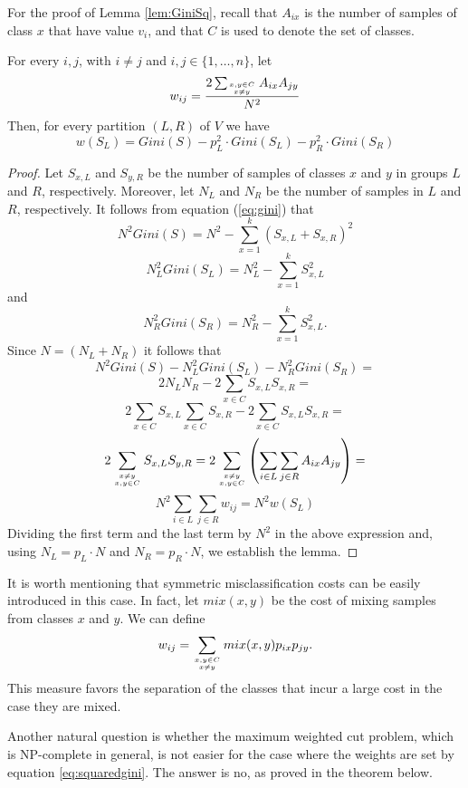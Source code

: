 For the proof of Lemma \ref{lem:GiniSq}, recall that $A_{ix}$ is the number
of samples of  class $x$ that have value $v_i$, and that $C$ is used to denote the set of classes.


\begin{lemma}
For every $i,j$, with $i \ne j$ and $i,j \in \{1,\ldots,n\}$,  let
\begin{equation}
 \label{eq:squaredgini}
w_{ij} = \frac{ 2 \sum_{ x,y \in C \atop x \ne y }  A_{ix} A_{jy} }{ N^2} 
\end{equation}
Then, for every partition $(L,R)$ of  $V$ we have
$$w(S_L)=Gini(S) - p^2_L \cdot Gini(S_L) - p^2_R \cdot Gini(S_R)$$
\label{lem:GiniSq}
\end{lemma}

\begin{proof}
Let $S_{x,L}$ and $S_{y,R}$  be the number of samples of classes $x$ and $y$ in groups $L$
and $R$, respectively. Moreover, let  $N_L$ and $N_R$ be 
the number of samples in $L$ and $R$, respectively.
It follows from equation (\ref{eq:gini}) that
$$N^2 Gini(S)=  N^2 -  \sum_{x=1}^k (S_{x,L} + S_{x,R})^2 $$
$$N_L^2 Gini(S_L)=  N_L^2 - \sum_{x=1}^k S_{x,L}^2 $$
and
$$N_R^2 Gini(S_R)= N_R^2 - \sum_{x=1}^k S_{x,L}^2. $$ 
Since $N=(N_L+N_R)$ it follows that 
$$N^2 Gini(S) - N_L^2 Gini(S_L)  - N_R^2 Gini(S_R) =$$
$$ 2 N_L N_R - 2 \sum_{x \in C} S_{x,L} S_{x,R} = $$
$$ 2  \sum_{x \in C } S_{x,L} \sum_{x \in C} S_{x,R}  - 2 \sum_{x \in C} S_{x,L} S_{x,R} =$$  
$$ 2  \sum_{ x \neq y \atop x,y \in C } S_{x,L} S_{y,R} =  2 \sum_{ x \neq y \atop x,y \in C } \left ( \sum_{ i \in L   }\sum_{ j \in R   }  A_{ix}A_{jy} \right ) =$$
$$ N^2 \sum_{i \in L  } \sum_{j \in R  } w_{ij} =  N^2 w(S_L) $$
Dividing the first term and the last term by $N^2$ in the  above expression and, using
 $N_L=p_L \cdot N$ and $N_R=p_R \cdot N$,
we  establish 
the lemma.
\end{proof}


It is worth mentioning that symmetric 
misclassification costs can be easily introduced in this case.
In fact, let $mix(x,y)$  be the cost 	
of  mixing  samples from classes $x$ and $y$.
We can define 
$$ w_{ij} =   \sum_{ x,y \in C \atop x \ne y } mix(x,y)  p_{ix} p_{jy} .$$
This measure favors the separation of the classes
that incur  a large cost in the case they are mixed.

Another natural question is whether the maximum weighted cut problem, which is NP-complete in general, is not easier for the case where the weights are set by equation \ref{eq:squaredgini}. The answer is no, as proved in the theorem below.

